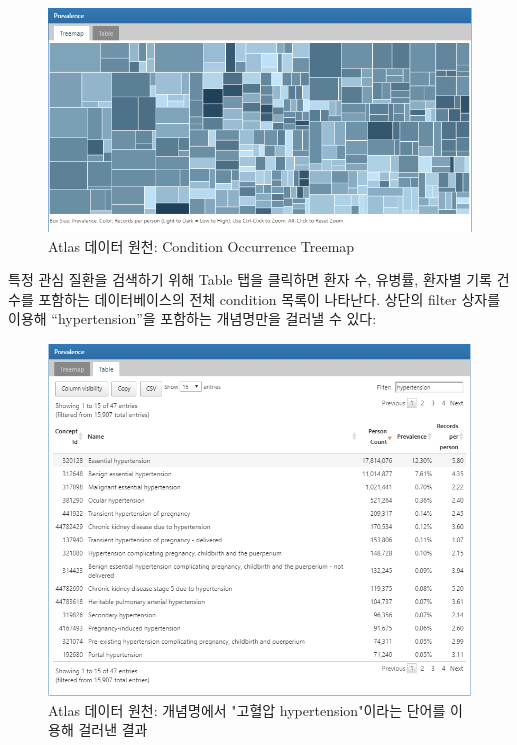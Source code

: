 \documentclass[10.5pt]{book}
\theoremstyle{definition}
\theoremstyle{definition}
\theoremstyle{definition}
\theoremstyle{remark}
\begin{document}
\begin{figure}

{\centering \includegraphics[width=1\linewidth]{images/Characterization/atlasDataSourcesConditionTreemap} 

}

\caption{Atlas 데이터 원천: Condition Occurrence Treemap}\label{fig:atlasDataSourcesConditionTreemap}
\end{figure}

특정 관심 질환을 검색하기 위해 Table 탭을 클릭하면 환자 수, 유병률,
환자별 기록 건수를 포함하는 데이터베이스의 전체 condition 목록이
나타난다. 상단의 filter 상자를 이용해 ``hypertension''을 포함하는
개념명만을 걸러낼 수 있다:

\begin{figure}

{\centering \includegraphics[width=1\linewidth]{images/Characterization/atlasDataSourcesConditionFiltered} 

}

\caption{Atlas 데이터 원천: 개념명에서 "고혈압 hypertension"이라는 단어를 이용해 걸러낸 결과}\label{fig:atlasDataSourcesConditionFiltered}
\end{figure}
\end{document}
